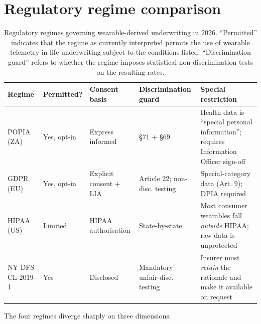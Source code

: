 \section{Regulatory regime comparison}\label{sec:regulatory}

\begin{table}[ht]
\centering\small
\caption{Regulatory regimes governing wearable-derived underwriting
in 2026. ``Permitted'' indicates that the regime as currently
interpreted permits the use of wearable telemetry in life
underwriting subject to the conditions listed. ``Discrimination
guard'' refers to whether the regime imposes statistical
non-discrimination tests on the resulting rates.}\label{tab:regulatory}
\setlength{\tabcolsep}{4pt}
\begin{tabular}{p{2.4cm}p{2.4cm}p{2.4cm}p{2.4cm}p{3.0cm}}
\toprule
Regime & Permitted? & Consent basis & Discrimination guard & Special restriction \\
\midrule
POPIA (ZA)         & Yes, opt-in    & Express informed
                                    & §71 + §69
                                    & Health data is ``special personal information'';
                                      requires Information Officer sign-off \\
GDPR (EU)          & Yes, opt-in    & Explicit consent + LIA
                                    & Article 22; non-disc. testing
                                    & Special-category data (Art. 9);
                                      DPIA required \\
HIPAA (US)         & Limited        & HIPAA authorisation
                                    & State-by-state
                                    & Most consumer wearables fall \emph{outside} HIPAA;
                                      raw data is unprotected \\
NY DFS CL 2019-1   & Yes            & Disclosed
                                    & Mandatory unfair-disc. testing
                                    & Insurer must \emph{retain} the rationale
                                      and make it available on request \\
\bottomrule
\end{tabular}
\end{table}

The four regimes diverge sharply on three dimensions:

